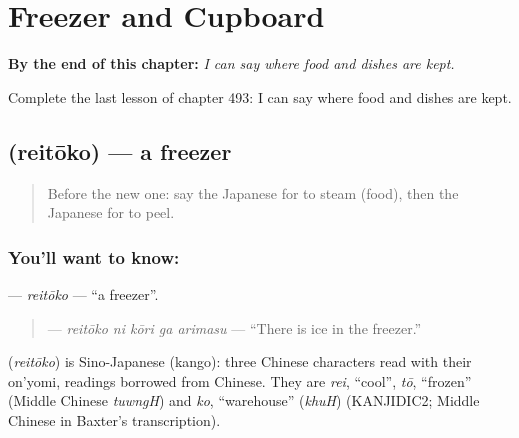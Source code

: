 
\chapter{Freezer and Cupboard}
\label{ch:ja-freezer-and-cupboard}

\begin{chapteropening}
\textbf{By the end of this chapter:} \emph{I can say where food and dishes are kept.}

Complete the last lesson of chapter 493: I can say where food and dishes are kept.
\end{chapteropening}

\section[\texorpdfstring{\ja{れいとうこ} (reitōko)}{れいとうこ (reitōko)}]{ (reitōko) — a freezer}

\label{lesson:JA-C493-reitouko}



\begin{quote}
Before the new one: say the Japanese for to steam (food), then the Japanese for to peel.
\end{quote}

\subsection*{You'll want to know: }
\textbf{} — \emph{reitōko} — \textquotedblleft{}a freezer\textquotedblright{}.

\begin{quote}
\textbf{  } — \emph{reitōko ni kōri ga arimasu} — \textquotedblleft{}There is ice in the freezer.\textquotedblright{}
\end{quote}

\begin{cousinweb}
\textbf{} (\emph{reitōko}) is Sino-Japanese (kango): three Chinese characters read with their on'yomi, readings borrowed from Chinese. They are \emph{rei}, \textquotedblleft{}cool\textquotedblright{}, \emph{tō}, \textquotedblleft{}frozen\textquotedblright{} (Middle Chinese \emph{tuwngH}) and \emph{ko}, \textquotedblleft{}warehouse\textquotedblright{} (\emph{khuH}) (KANJIDIC2; Middle Chinese in Baxter's transcription).
\end{cousinweb}

